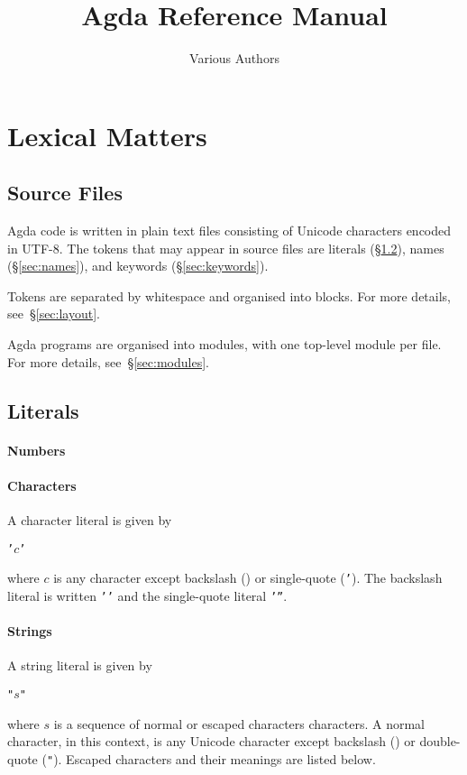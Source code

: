 \documentclass{article}
\begin{document}
\title{Agda Reference Manual}
\author{Various Authors}
\maketitle
\section{Lexical Matters}
\subsection{Source Files}
Agda code is written in plain text files consisting of Unicode characters encoded in UTF-8.
The tokens that may appear in source files are literals (\S\ref{sec:literals}), names (\S\ref{sec:names}), and keywords (\S\ref{sec:keywords}).

Tokens are separated by whitespace and organised into blocks.
For more details, see~\S\ref{sec:layout}.

Agda programs are organised into modules, with one top-level module per file.
For more details, see~\S\ref{sec:modules}.
\subsection{Literals}
\label{sec:literals}
\paragraph{Numbers}
\paragraph{Characters}
A character literal is given by
\begin{alltt}
'\(c\)'
\end{alltt}
where $c$ is any character except backslash (\texttt{}) or single-quote (\texttt{'}).
The backslash literal is written \texttt{''} and the single-quote literal \texttt{'''}.
\paragraph{Strings}
A string literal is given by
\begin{alltt}
"\(s\)"
\end{alltt}
where $s$ is a sequence of normal or escaped characters characters.
A normal character, in this context, is any Unicode character except backslash (\texttt{}) or double-quote (\texttt{"}).
Escaped characters and their meanings are listed below.
\end{document}
